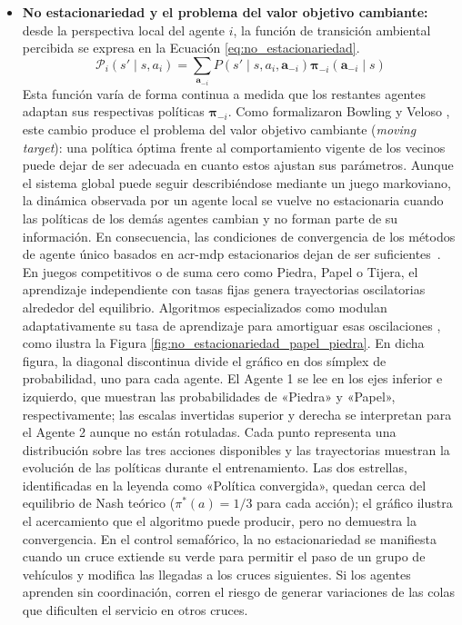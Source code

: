 \begin{itemize}
    \item \textbf{No estacionariedad y el problema del valor objetivo cambiante:} desde la perspectiva local del agente $i$, la función de transición ambiental percibida se expresa en la Ecuación \eqref{eq:no_estacionariedad}.
    \begin{equation}
        \mathcal{P}_i(s' \mid s, a_i) = \sum_{\mathbf{a}_{-i}} P(s' \mid s, a_i, \mathbf{a}_{-i}) \boldsymbol{\pi}_{-i}(\mathbf{a}_{-i} \mid s)
        \label{eq:no_estacionariedad}
    \end{equation}
    Esta función varía de forma continua a medida que los restantes agentes adaptan sus respectivas políticas $\boldsymbol{\pi}_{-i}$. Como formalizaron Bowling y Veloso \cite{bowling2002multiagent}, este cambio produce el problema del valor objetivo cambiante (\textit{moving target}): una política óptima frente al comportamiento vigente de los vecinos puede dejar de ser adecuada en cuanto estos ajustan sus parámetros. Aunque el sistema global puede seguir describiéndose mediante un juego markoviano, la dinámica observada por un agente local se vuelve no estacionaria cuando las políticas de los demás agentes cambian y no forman parte de su información. En consecuencia, las condiciones de convergencia de los métodos de agente único basados en \acrshort{acr-mdp} estacionarios dejan de ser suficientes~\cite{foerster2017,liang2025marlreview}.
    En juegos competitivos o de suma cero como Piedra, Papel o Tijera, el aprendizaje independiente con tasas fijas genera trayectorias oscilatorias alrededor del equilibrio. Algoritmos especializados como  modulan adaptativamente su tasa de aprendizaje para amortiguar esas oscilaciones \cite{bowling2002multiagent}, como ilustra la Figura \ref{fig:no_estacionariedad_papel_piedra}. En dicha figura, la diagonal discontinua divide el gráfico en dos símplex de probabilidad, uno para cada agente. El Agente 1 se lee en los ejes inferior e izquierdo, que muestran las probabilidades de «Piedra» y «Papel», respectivamente; las escalas invertidas superior y derecha se interpretan para el Agente 2 aunque no están rotuladas. Cada punto representa una distribución sobre las tres acciones disponibles y las trayectorias muestran la evolución de las políticas durante el entrenamiento. Las dos estrellas, identificadas en la leyenda como «Política convergida», quedan cerca del equilibrio de Nash teórico ($\pi^*(a) = 1/3$ para cada acción); el gráfico ilustra el acercamiento que el algoritmo puede producir, pero no demuestra la convergencia. En el control semafórico, la no estacionariedad se manifiesta cuando un cruce extiende su verde para permitir el paso de un grupo de vehículos y modifica las llegadas a los cruces siguientes. Si los agentes aprenden sin coordinación, corren el riesgo de generar variaciones de las colas que dificulten el servicio en otros cruces.


\end{itemize}
